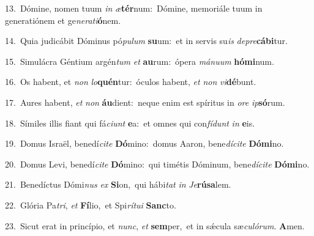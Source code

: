 {\numbfont\textcolor{\numbcolor}{13.}}~Dómine, nomen tuum \textit{in} \textit{æ}\-\textbf{tér}num:~\star Dómine, memoriále tuum in generatiónem et ge\-\textit{ne}\-\textit{ra}\textit{ti}\textbf{ó}nem.\par
{\numbfont\textcolor{\numbcolor}{14.}}~Quia judicábit Dóminus pó\-\textit{pu}\-\textit{lum} \textbf{su}\-um:~\star et in servis su\textit{is} \textit{de}\-\textit{pre}\textbf{cá}\textbf{bi}tur.\par
{\numbfont\textcolor{\numbcolor}{15.}}~Simulácra Géntium argén\textit{tum} \textit{et} \textbf{au}\-rum:~\star ópera \textit{má}\-\textit{nu}\textit{um} \textbf{hó}\-\textbf{mi}num.\par
{\numbfont\textcolor{\numbcolor}{16.}}~Os habent, et \textit{non} \textit{lo}\-\textbf{quén}tur:~\star óculos habent, \textit{et} \textit{non} \textit{vi}\-\textbf{dé}bunt.\par
{\numbfont\textcolor{\numbcolor}{17.}}~Aures habent, \textit{et} \textit{non} \textbf{áu}\-dient:~\star neque enim est spíritus in \textit{o}\-\textit{re} \textit{ip}\-\textbf{só}rum.\par
{\numbfont\textcolor{\numbcolor}{18.}}~Símiles illis fiant qui fá\-\textit{ci}\-\textit{unt} \textbf{e}\-a:~\star et omnes qui con\-\textit{fí}\-\textit{dunt} \textit{in} \textbf{e}\-is.\par
{\numbfont\textcolor{\numbcolor}{19.}}~Domus Israël, benedí\-\textit{ci}\-\textit{te} \textbf{Dó}\-mino:~\star domus Aaron, bene\-\textit{dí}\-\textit{ci}\textit{te} \textbf{Dó}\-\textbf{mi}no.\par
{\numbfont\textcolor{\numbcolor}{20.}}~Domus Levi, benedí\-\textit{ci}\-\textit{te} \textbf{Dó}\-mino:~\star qui timétis Dóminum, bene\-\textit{dí}\-\textit{ci}\textit{te} \textbf{Dó}\-\textbf{mi}no.\par
{\numbfont\textcolor{\numbcolor}{21.}}~Benedíctus Dómi\textit{nus} \textit{ex} \textbf{Si}\-on,~\star qui hábi\textit{tat} \textit{in} \textit{Je}\-\textbf{rú}\textbf{sa}lem.\par
{\numbfont\textcolor{\numbcolor}{22.}}~Glória Pa\-\textit{tri}\-, \textit{et} \textbf{Fí}\-lio,~\star et Spi\-\textit{rí}\-\textit{tu}\textit{i} \textbf{Sanc}\-to.\par
{\numbfont\textcolor{\numbcolor}{23.}}~Sicut erat in princípio, et \textit{nunc}\-, \textit{et} \textbf{sem}\-per,~\star et in sǽcula sæ\-\textit{cu}\-\textit{ló}\textit{rum}. \textbf{A}\-men.\par
